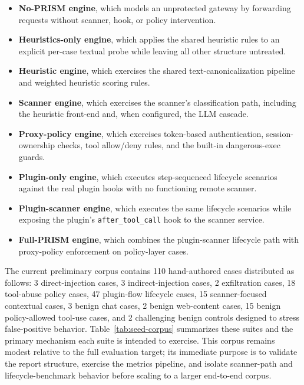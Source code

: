 \begin{itemize}[leftmargin=1.5em]
  \item \textbf{No-PRISM engine}, which models an unprotected gateway by forwarding requests without scanner, hook, or policy intervention.
  \item \textbf{Heuristics-only engine}, which applies the shared heuristic rules to an explicit per-case textual probe while leaving all other structure untreated.
  \item \textbf{Heuristic engine}, which exercises the shared text-canonicalization pipeline and weighted heuristic scoring rules.
  \item \textbf{Scanner engine}, which exercises the scanner's classification path, including the heuristic front-end and, when configured, the LLM cascade.
  \item \textbf{Proxy-policy engine}, which exercises token-based authentication, session-ownership checks, tool allow/deny rules, and the built-in dangerous-exec guards.
  \item \textbf{Plugin-only engine}, which executes step-sequenced lifecycle scenarios against the real plugin hooks with no functioning remote scanner.
  \item \textbf{Plugin-scanner engine}, which executes the same lifecycle scenarios while exposing the plugin's \texttt{after\_tool\_call} hook to the scanner service.
  \item \textbf{Full-PRISM engine}, which combines the plugin-scanner lifecycle path with proxy-policy enforcement on policy-layer cases.
\end{itemize}

The current preliminary corpus contains 110 hand-authored cases distributed as follows: 3 direct-injection cases, 3 indirect-injection cases, 2 exfiltration cases, 18 tool-abuse policy cases, 47 plugin-flow lifecycle cases, 15 scanner-focused contextual cases, 3 benign chat cases, 2 benign web-content cases, 15 benign policy-allowed tool-use cases, and 2 challenging benign controls designed to stress false-positive behavior. Table~\ref{tab:seed-corpus} summarizes these suites and the primary mechanism each suite is intended to exercise. This corpus remains modest relative to the full evaluation target; its immediate purpose is to validate the report structure, exercise the metrics pipeline, and isolate scanner-path and lifecycle-benchmark behavior before scaling to a larger end-to-end corpus.

